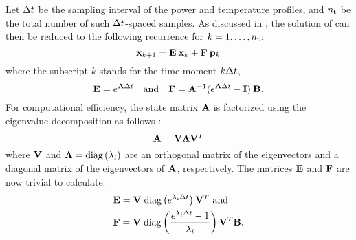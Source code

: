 Let $\Delta t$ be the sampling interval of the power and temperature profiles, and ${n_\text{t}}$ be the total number of such $\Delta t$-spaced samples. As discussed in \cite{ukhov2012}, the solution of  can then be reduced to the following recurrence for $k = 1, \dots, {n_\text{t}}$:
\begin{equation} \elabel{recurrence}
  \vX_{k + 1} = \mE \: \vX_k + \mF \: \vP_k
\end{equation}
where the subscript $k$ stands for the time moment $k \Delta t$,
\[
  \mathbf{E} = e^{\mathbf{A} \Delta t} \hspace{1em} \text{and} \hspace{1em} \mathbf{F} = \mathbf{A}^{-1} (e^{\mathbf{A} \Delta t} - \mathbf{I}) \: \mathbf{B}.
\]
For computational efficiency, the state matrix $\mathbf{A}$ is factorized using the eigenvalue decomposition as follows \cite{press2007}:
\begin{equation} \elabel{eigenvalue-decomposition}
  \mA = \mV \mL \mV^T
\end{equation}
where $\mathbf{V}$ and $\mathbf{\Lambda} = \text{diag}\left( \lambda_i \right)$ are an orthogonal matrix of the eigenvectors and a diagonal matrix of the eigenvectors of $\mathbf{A}$, respectively.
The matrices $\mathbf{E}$ and $\mathbf{F}$ are now trivial to calculate:
\begin{align*}
  & \mathbf{E} = \mathbf{V} \; \text{diag}\left( e^{\lambda_i \Delta t} \right) \mathbf{V}^T \text{ and} \\
  & \mathbf{F} = \mathbf{V} \; \text{diag}\left(  \frac{e^{\lambda_i \Delta t} - 1}{\lambda_i}  \right) \mathbf{V}^T \mathbf{B}.
\end{align*}
